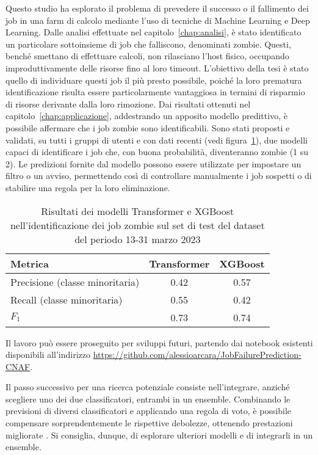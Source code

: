 \label{chap:conclusione}

Questo studio ha esplorato il problema di prevedere il successo o il
fallimento dei job in una farm di calcolo mediante l'uso di tecniche di
Machine Learning e Deep Learning. Dalle analisi effettuate nel
capitolo~\ref{chap:analisi}, è stato identificato un particolare sottoinsieme
di job che falliscono, denominati zombie. Questi, benché smettano di
effettuare calcoli, non rilasciano l'host fisico, occupando improduttivamente
delle risorse fino al loro timeout. L'obiettivo della tesi è stato quello di
individuare questi job il più presto possibile, poiché la loro prematura
identificazione risulta essere particolarmente vantaggiosa in termini di
risparmio di risorse derivante dalla loro rimozione. Dai risultati ottenuti
nel capitolo~\ref{chap:applicazione}, addestrando un apposito modello
predittivo, è possibile affermare che i job zombie sono identificabili. Sono
stati proposti e validati, su tutti i gruppi di utenti e con dati recenti
(vedi figura~\ref{table:model_results}), due modelli capaci di identificare i
job che, con buona probabilità, diventeranno zombie (1 su 2). Le predizioni
fornite dal modello possono essere utilizzate per impostare un filtro o un
avviso, permettendo così di controllare manualmente i job sospetti o di
stabilire una regola per la loro eliminazione.

\begin{table}[!ht]
    \centering
    \begin{tabular}{lcc}
        \toprule
        Metrica & Transformer & XGBoost \\ 
        \midrule
        Precisione (classe minoritaria) & 0.42 & 0.57 \\ 
        Recall (classe minoritaria) & 0.55 & 0.42 \\ 
        $F_1$ & 0.73 & 0.74 \\ 
        \bottomrule
    \end{tabular}
    \caption{\small Risultati dei modelli Transformer e XGBoost nell'identificazione
    dei job zombie sul set di test del dataset del periodo 13-31 marzo 2023}
    \label{table:model_results}
\end{table}

Il lavoro può essere proseguito per sviluppi futuri, partendo dai notebook
esistenti disponibili all'indirizzo
\url{https://github.com/alessioarcara/JobFailurePrediction-CNAF}.

Il passo successivo per una ricerca potenziale consiste nell'integrare,
anziché scegliere uno dei due classificatori, entrambi in un ensemble.
Combinando le previsioni di diversi classificatori e applicando una regola di
voto, è possibile compensare sorprendentemente le rispettive debolezze,
ottenendo prestazioni migliorate \cite{geron2019}. Si consiglia, dunque, di
esplorare ulteriori modelli e di integrarli in un ensemble.

